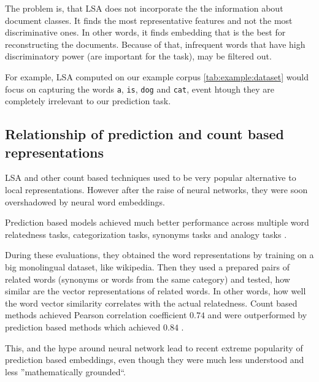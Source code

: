         The problem is, that LSA does not incorporate the the information about document classes. 
        It finds the most representative features and not the most discriminative ones.
        In other words, it finds embedding that is the best for reconstructing the documents.
        Because of that, infrequent words that have high discriminatory power (are important for the task), may be filtered out.
        
        For example, LSA computed on our example corpus \ref{tab:example:dataset} would focus on capturing the words \texttt{a}, \texttt{is}, \texttt{dog} and \texttt{cat},
        event htough they are completely irrelevant to our prediction task.
        
        \* %
        
        \subsection{Relationship of prediction and count based representations}
            
            LSA and other count based techniques used to be very popular alternative to local representations.
            However after the raise of neural networks, they were soon overshadowed by neural word embeddings.
            
            Prediction based models achieved much better performance across multiple word relatedness tasks, categorization tasks, synonyms tasks and analogy tasks \cite{baroni2014don}. %
            
            During these evaluations, they obtained the word representations by training on a big monolingual dataset, like wikipedia.
            Then they used a prepared pairs of related words (synonyms or words from the same category) and tested,
            how similar are the vector representations of related words. 
            In other words, how well the word vector similarity correlates with the actual relatedness. 
            Count based methods achieved Pearson correlation coefficient $0.74$ and were outperformed by prediction based methods which achieved $0.84$ \cite{baroni2014don}.
            
            This, and the hype around neural network lead to recent extreme popularity of prediction based embeddings,
            even though they were much less understood and less ''mathematically grounded``.
            
